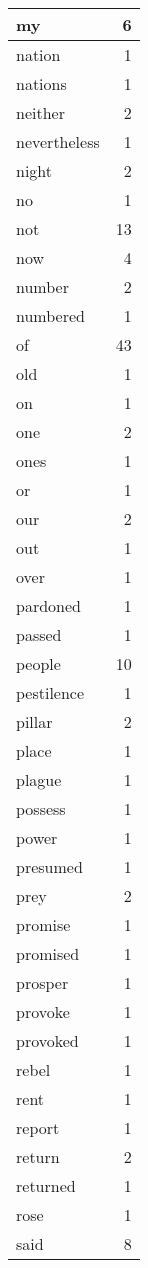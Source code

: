 \begin{center}
\begin{longtable}{l|r}
my & 6 \\ \hline
nation & 1 \\ \hline
nations & 1 \\ \hline
neither & 2 \\ \hline
nevertheless & 1 \\ \hline
night & 2 \\ \hline
no & 1 \\ \hline
not & 13 \\ \hline
now & 4 \\ \hline
number & 2 \\ \hline
numbered & 1 \\ \hline
of & 43 \\ \hline
old & 1 \\ \hline
on & 1 \\ \hline
one & 2 \\ \hline
ones & 1 \\ \hline
or & 1 \\ \hline
our & 2 \\ \hline
out & 1 \\ \hline
over & 1 \\ \hline
pardoned & 1 \\ \hline
passed & 1 \\ \hline
people & 10 \\ \hline
pestilence & 1 \\ \hline
pillar & 2 \\ \hline
place & 1 \\ \hline
plague & 1 \\ \hline
possess & 1 \\ \hline
power & 1 \\ \hline
presumed & 1 \\ \hline
prey & 2 \\ \hline
promise & 1 \\ \hline
promised & 1 \\ \hline
prosper & 1 \\ \hline
provoke & 1 \\ \hline
provoked & 1 \\ \hline
rebel & 1 \\ \hline
rent & 1 \\ \hline
report & 1 \\ \hline
return & 2 \\ \hline
returned & 1 \\ \hline
rose & 1 \\ \hline
said & 8 \\ \hline

\end{longtable}
\end{center}
